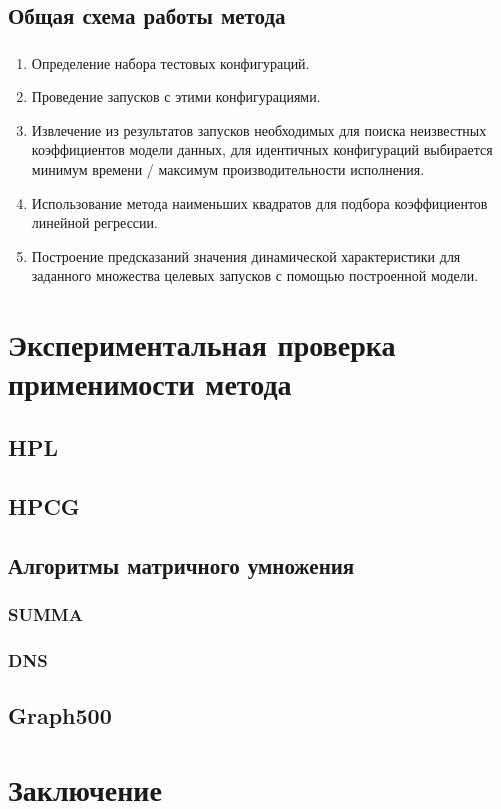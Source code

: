 \documentclass[unicode, t]{beamer}%
\begin{document}
		\subsection{Общая схема работы метода}
		\begin{frame}
			\frametitle{\insertsection}
	 		\framesubtitle{\insertsubsection}
	 		\begin{enumerate}[label=\(\Roman{enumi}\)]
				\item Определение набора тестовых конфигураций.
				\item Проведение запусков с этими конфигурациями.
				\item Извлечение из результатов запусков необходимых для поиска неизвестных коэффициентов модели данных, для идентичных конфигураций выбирается минимум времени / максимум производительности исполнения.
				\item Использование метода наименьших квадратов для подбора коэффициентов линейной регрессии.
				\item Построение предсказаний значения динамической характеристики для заданного множества целевых запусков с помощью построенной модели.
			\end{enumerate}
		\end{frame}

	\section{Экспериментальная проверка применимости метода}
		\subsection{HPL}
		\subsection{HPCG}
		\subsection{Алгоритмы матричного умножения}
			\subsubsection{SUMMA}
			\subsubsection{DNS}
		\subsection{Graph500}
	\section{Заключение}
\end{document}
